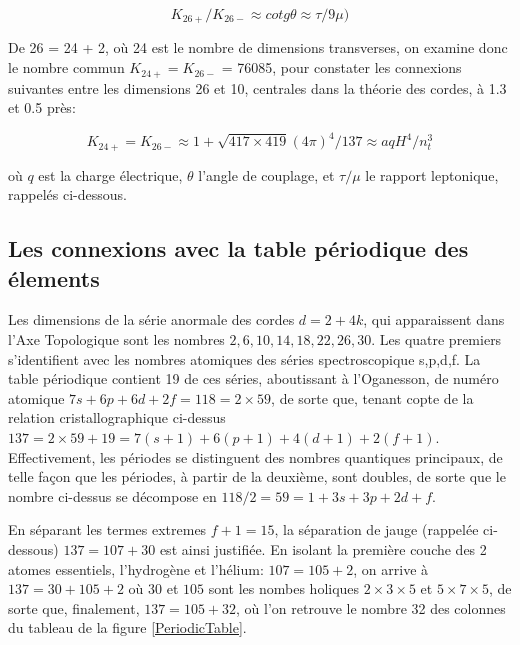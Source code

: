 \documentclass[a4paper,9pt]{article}
\newcounter{col}
\begin{document}
\begin{equation}
   K_{26+}/K_{26-}\approx cotg\theta \approx \tau/9\mu)   
 \end{equation}

De 26 = 24 + 2, où 24 est le nombre de dimensions transverses, on examine donc le nombre commun $K_{24+} = K_{26-}$ = 76085, pour constater les connexions suivantes entre les dimensions 26 et 10, centrales dans la théorie des cordes, à 1.3 et 0.5 près:

\begin{equation}
K_{24+} = K_{26-} \approx 1+ \sqrt{417\times 419} (4\pi)^4/137 \approx a q H^4/n_t^3 
 \end{equation}
 
où $q$ est la charge électrique, $\theta$ l'angle de couplage, et $\tau/\mu$ le rapport leptonique, rappelés ci-dessous.

\subsection{Les connexions avec la table périodique des élements}

Les dimensions de la série anormale des cordes $d = 2 + 4k$, qui apparaissent dans l’Axe Topologique sont les nombres $2, 6, 10, 14, 18, 22, 26, 30$. Les quatre premiers s’identifient avec les nombres atomiques des séries spectroscopique s,p,d,f. La table périodique contient 19 de ces séries, aboutissant à l’Oganesson, de numéro atomique $7s + 6p + 6d + 2f = 118 = 2 \times 59$, de sorte que, tenant copte de la relation cristallographique ci-dessus $137 = 2 \times 59 + 19  = 7(s+1)+6(p+1)+4(d+1)+2(f+1)$. Effectivement, les périodes se distinguent des nombres quantiques principaux, de telle façon que les périodes, à partir de la deuxième, sont doubles, de sorte que le nombre ci-dessus se décompose en $118/2 = 59 =  1+3s+3p+2d+f$.

En séparant les termes extremes $f + 1 = 15$, la séparation de jauge (rappelée ci-dessous) $137 = 107 + 30$ est ainsi justifiée. En isolant la première couche des 2 atomes essentiels, l'hydrogène et l'hélium: $107 = 105 + 2$, on arrive à $137 = 30 + 105 + 2$ où $30$ et $105$ sont les nombes holiques $2\times 3 \times 5$ et $5\times 7 \times 5$, de sorte que, finalement, $ 137 = 105 + 32$, où l'on retrouve le nombre 32 des colonnes du tableau de la figure \ref{PeriodicTable}. 
\end{document}
